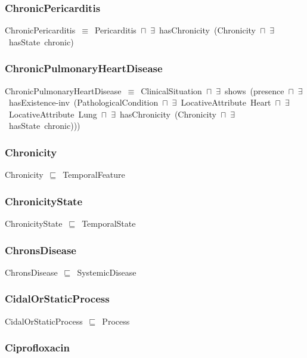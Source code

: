 \documentclass{article}
\begin{document}
\subsubsection*{ChronicPericarditis}

ChronicPericarditis~\ensuremath{\equiv}~Pericarditis~\ensuremath{\sqcap}~\ensuremath{\exists}~hasChronicity~(Chronicity~\ensuremath{\sqcap}~\ensuremath{\exists}~hasState~chronic)

\subsubsection*{ChronicPulmonaryHeartDisease}

ChronicPulmonaryHeartDisease~\ensuremath{\equiv}~ClinicalSituation~\ensuremath{\sqcap}~\ensuremath{\exists}~shows~(presence~\ensuremath{\sqcap}~\ensuremath{\exists}~hasExistence-inv~(PathologicalCondition~\ensuremath{\sqcap}~\ensuremath{\exists}~LocativeAttribute~Heart~\ensuremath{\sqcap}~\ensuremath{\exists}~LocativeAttribute~Lung~\ensuremath{\sqcap}~\ensuremath{\exists}~hasChronicity~(Chronicity~\ensuremath{\sqcap}~\ensuremath{\exists}~hasState~chronic)))

\subsubsection*{Chronicity}

Chronicity~\ensuremath{\sqsubseteq}~TemporalFeature~

\subsubsection*{ChronicityState}

ChronicityState~\ensuremath{\sqsubseteq}~TemporalState~

\subsubsection*{ChronsDisease}

ChronsDisease~\ensuremath{\sqsubseteq}~SystemicDisease~

\subsubsection*{CidalOrStaticProcess}

CidalOrStaticProcess~\ensuremath{\sqsubseteq}~Process~

\subsubsection*{Ciprofloxacin}
\end{document}
